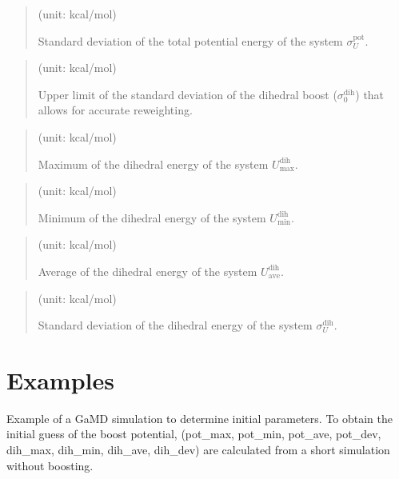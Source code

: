 \documentclass[a4paper,11pt,oneside,english]{sphinxmanual}
\begin{document}
 
\begin{quote}

 (unit: kcal/mol)

Standard deviation of the total potential energy of the system \(\sigma_{U}^{\mathrm{pot}}\).
\end{quote}

 
\begin{quote}

 (unit: kcal/mol)

Upper limit of the standard deviation of the dihedral
boost (\(\sigma_0^{\mathrm{dih}}\)) that allows
for accurate reweighting.
\end{quote}

 
\begin{quote}

 (unit: kcal/mol)

Maximum of the dihedral energy of the system \(U_{\mathrm{max}}^{\mathrm{dih}}\).
\end{quote}

 
\begin{quote}

 (unit: kcal/mol)

Minimum of the dihedral energy of the system \(U_{\mathrm{min}}^{\mathrm{dih}}\).
\end{quote}

 
\begin{quote}

 (unit: kcal/mol)

Average of the dihedral energy of the system \(U_{\mathrm{ave}}^{\mathrm{dih}}\).
\end{quote}

 
\begin{quote}

 (unit: kcal/mol)

Standard deviation of the dihedral energy of the system \(\sigma_{U}^{\mathrm{dih}}\).
\end{quote}


\section{Examples}
\label{\detokenize{16_GaMD:examples}}
Example of a GaMD simulation to determine initial parameters.
To obtain the initial guess of the boost potential,
(pot\_max, pot\_min, pot\_ave, pot\_dev, dih\_max, dih\_min, dih\_ave, dih\_dev)
are calculated from a short simulation without boosting.
\end{document}
